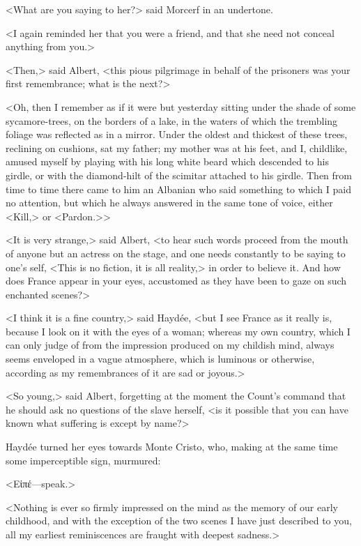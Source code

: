  <What are you saying to her?> said Morcerf in an undertone. 

 <I again reminded her that you were a friend, and that she need not conceal anything from you.> 

 <Then,> said Albert, <this pious pilgrimage in behalf of the prisoners was your first remembrance; what is the next?> 

 <Oh, then I remember as if it were but yesterday sitting under the shade of some sycamore-trees, on the borders of a lake, in the waters of which the trembling foliage was reflected as in a mirror. Under the oldest and thickest of these trees, reclining on cushions, sat my father; my mother was at his feet, and I, childlike, amused myself by playing with his long white beard which descended to his girdle, or with the diamond-hilt of the scimitar attached to his girdle. Then from time to time there came to him an Albanian who said something to which I paid no attention, but which he always answered in the same tone of voice, either <Kill,> or <Pardon.>> 

 <It is very strange,> said Albert, <to hear such words proceed from the mouth of anyone but an actress on the stage, and one needs constantly to be saying to one's self, <This is no fiction, it is all reality,> in order to believe it. And how does France appear in your eyes, accustomed as they have been to gaze on such enchanted scenes?> 

 <I think it is a fine country,> said Haydée, <but I see France as it really is, because I look on it with the eyes of a woman; whereas my own country, which I can only judge of from the impression produced on my childish mind, always seems enveloped in a vague atmosphere, which is luminous or otherwise, according as my remembrances of it are sad or joyous.> 

 <So young,> said Albert, forgetting at the moment the Count's command that he should ask no questions of the slave herself, <is it possible that you can have known what suffering is except by name?> 

 Haydée turned her eyes towards Monte Cristo, who, making at the same time some imperceptible sign, murmured: 

 <Εἰπέ—speak.> 

 <Nothing is ever so firmly impressed on the mind as the memory of our early childhood, and with the exception of the two scenes I have just described to you, all my earliest reminiscences are fraught with deepest sadness.>

